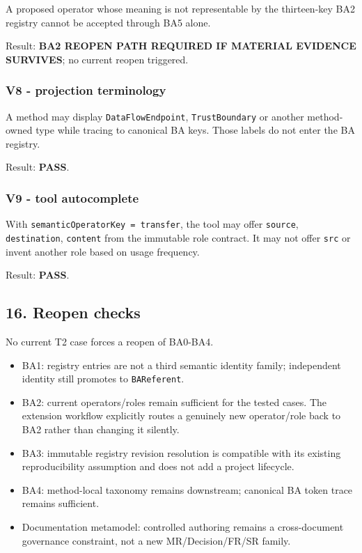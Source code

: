 \documentclass[
  10pt,
  a4paper,
]{article}
\providecommand{\tightlist}{%
  \setlength{\itemsep}{0pt}\setlength{\parskip}{0pt}}
\begin{document}
A proposed operator whose meaning is not representable by the
thirteen-key BA2 registry cannot be accepted through BA5 alone.

Result: \textbf{BA2 REOPEN PATH REQUIRED IF MATERIAL EVIDENCE SURVIVES};
no current reopen triggered.

\subsubsection{V8 - projection
terminology}\label{v8---projection-terminology}

A method may display \texttt{DataFlowEndpoint}, \texttt{TrustBoundary}
or another method-owned type while tracing to canonical BA keys. Those
labels do not enter the BA registry.

Result: \textbf{PASS}.

\subsubsection{V9 - tool autocomplete}\label{v9---tool-autocomplete}

With \texttt{semanticOperatorKey\ =\ transfer}, the tool may offer
\texttt{source}, \texttt{destination}, \texttt{content} from the
immutable role contract. It may not offer \texttt{src} or invent another
role based on usage frequency.

Result: \textbf{PASS}.

\subsection{16. Reopen checks}\label{reopen-checks}

No current T2 case forces a reopen of BA0-BA4.

\begin{itemize}
\tightlist
\item
  BA1: registry entries are not a third semantic identity family;
  independent identity still promotes to \texttt{BAReferent}.
\item
  BA2: current operators/roles remain sufficient for the tested cases.
  The extension workflow explicitly routes a genuinely new operator/role
  back to BA2 rather than changing it silently.
\item
  BA3: immutable registry revision resolution is compatible with its
  existing reproducibility assumption and does not add a project
  lifecycle.
\item
  BA4: method-local taxonomy remains downstream; canonical BA token
  trace remains sufficient.
\item
  Documentation metamodel: controlled authoring remains a cross-document
  governance constraint, not a new MR/Decision/FR/SR family.
\end{itemize}
\end{document}
